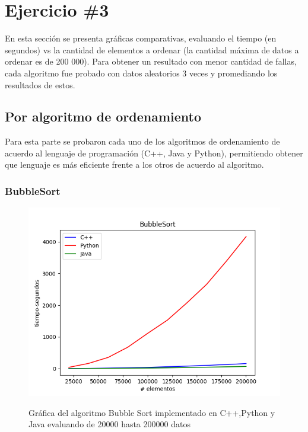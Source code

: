 \section*{Ejercicio \#3}
En esta sección se presenta gráficas comparativas, evaluando el tiempo (en segundos) vs la cantidad de elementos a ordenar (la cantidad máxima de datos a ordenar es de 200 000). Para obtener un resultado con menor cantidad de fallas, cada algoritmo fue probado con datos aleatorios 3 veces y promediando los resultados de estos.
\subsection*{Por algoritmo de ordenamiento}
Para esta parte se probaron cada uno de los algoritmos de ordenamiento de acuerdo al lenguaje de programación (C++, Java y Python), permitiendo obtener que lenguaje es más eficiente frente a los otros de acuerdo al algoritmo.

\subsubsection*{BubbleSort}
\begin{figure}[H]
	   \centering
	   \includegraphics[scale=0.5]{Practica01/images/plots/BubbleSort.png}
	   \label{imgBubble}
	   \caption{Gráfica del algoritmo Bubble Sort implementado en C++,Python y Java evaluando de 20000 hasta 200000 datos}
\end{figure}

